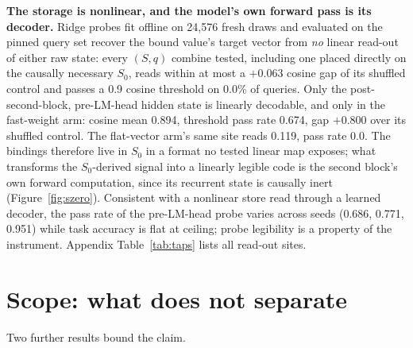 \documentclass{article}
\begin{document}
\textbf{The storage is nonlinear, and the model's own forward pass is
its decoder.} Ridge probes fit offline on 24{,}576 fresh draws and evaluated
on the pinned query set recover the bound value's target vector from
\emph{no} linear read-out of either raw state: every $(S, q)$ combine
tested, including one placed directly on the causally necessary $S_0$,
reads within at most a $+0.063$ cosine gap of its shuffled control and
passes a 0.9 cosine threshold on 0.0\% of queries. %
Only the post-second-block, pre-LM-head hidden state is linearly
decodable, and only in the fast-weight arm: cosine mean 0.894, threshold
pass rate 0.674, gap $+0.800$ over its shuffled
control. %
The flat-vector arm's same site reads 0.119, pass rate
0.0. %
The bindings therefore live in $S_0$ in a format no tested linear map
exposes; what transforms the $S_0$-derived signal into a linearly
legible code is the second block's own forward computation, since its
recurrent state is causally inert (Figure~\ref{fig:szero}). Consistent
with a nonlinear store read through a learned decoder, the pass rate of
the pre-LM-head probe varies across seeds (0.686, 0.771, 0.951) while
task accuracy is flat at ceiling; %
probe legibility is a property of the instrument.
Appendix Table~\ref{tab:taps} lists all read-out sites.

\section{Scope: what does not separate}
\label{sec:scope}

Two further results bound the claim.

\begin{table}[t]
\centering
\small
\tabletasktwo
\caption{Multi-hop variant, nine seeds per compared arm, accuracy at the
matched final checkpoint (chance 0.031, demonstration bar 0.094; readings
above the bar in bold). Three of nine matrix fast-weight seeds learn the
task; zero of nine flat-vector seeds do. The pooled paired interval
straddles zero and is additionally flagged non-decision-grade by a
pre-registered batch-effect gate, so this table is a trainability
disclosure, not a capability claim.}
\label{tab:task2}
\end{table}
\end{document}
